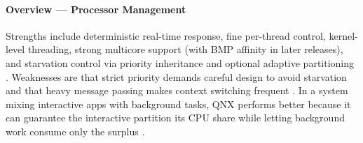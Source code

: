 \paragraph{Overview --- Processor Management}

Strengths include deterministic real-time response, fine per-thread
control, kernel-level threading, strong multicore support (with BMP
affinity in later releases), and starvation control via priority
inheritance and optional adaptive partitioning
\citep{qnx_kernel_sysarch, qnx_smp_multicore, qnx_neutrino_overview,
qnx_aps}. Weaknesses
are that strict priority demands careful design to avoid starvation and
that heavy message passing makes context switching frequent
\citep{qnx_arm_memory}. In a system mixing interactive apps with
background tasks, QNX performs better because it can guarantee the
interactive partition its CPU share while letting background work
consume only the surplus \citep{qnx_aps}.
